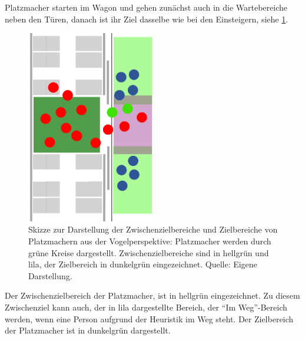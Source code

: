 Platzmacher starten im Wagon und gehen zunächst auch in die Wartebereiche neben den Türen, danach ist ihr Ziel dasselbe wie bei den Einsteigern, siehe \figurename \ref{fig:SkizzePlatzmacher}.
\begin{figure}[H]
	\centering
		\includegraphics[angle=270, width=0.5\textwidth]{pictures/model/kognitive_heuristic_model/spacemaker_sketch.png}
	\caption{Skizze zur Darstellung der Zwischenzielbereiche und Zielbereiche von Platzmachern aus der Vogelperspektive: Platzmacher werden durch grüne Kreise dargestellt. Zwischenzielbereiche sind in hellgrün und lila, der Zielbereich in dunkelgrün eingezeichnet. Quelle: Eigene Darstellung.}
	\label{fig:SkizzePlatzmacher}
\end{figure}
Der Zwischenzielbereich der Platzmacher, ist in hellgrün eingezeichnet. Zu diesem Zwischenziel kann auch, der in lila dargestellte Bereich, der "`Im Weg"'-Bereich werden, wenn eine Person aufgrund der Heuristik im Weg steht. Der Zielbereich der Platzmacher ist in dunkelgrün dargestellt.
